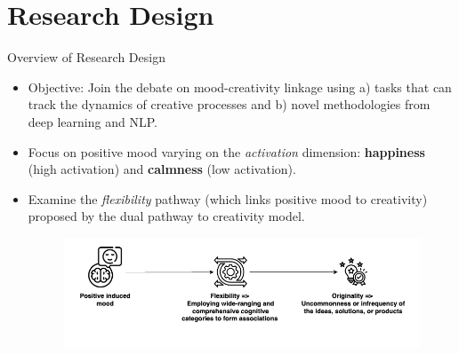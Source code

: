 \documentclass[pdf]{beamer}
\begin{document}
\section{Research Design}
\begin{frame}{Overview of Research Design}
\begin{itemize}
    \item<1-> \alert{Objective}: Join the debate on mood-creativity linkage using a) tasks that can track the dynamics of creative processes and b) novel methodologies from deep learning and NLP.
    \item<2-> Focus on positive mood varying on the \textit{activation} dimension: \textbf{happiness} (high activation) and \textbf{calmness} (low activation).
    \item<3-> Examine the \textit{flexibility} pathway (which links positive mood to creativity) proposed by the dual pathway to creativity model. 
    \vspace{2em}
     {
    \begin{figure}
        \centering
        \includegraphics[width=\linewidth]{drawio/Overview of Research Design_Partial.png}
    \end{figure}
    }
\end{itemize}
\end{frame}
\end{document}

